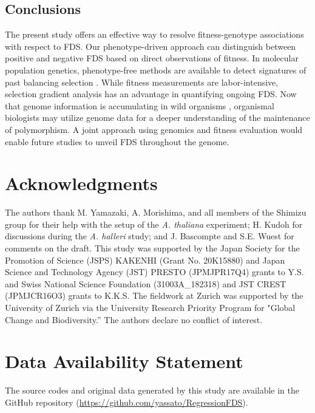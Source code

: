 \documentclass[12pt,]{article}
\begin{document}
\subsection{Conclusions}
The present study offers an effective way to resolve fitness-genotype associations with respect to FDS. Our phenotype-driven approach can distinguish between positive and negative FDS based on direct observations of fitness. In molecular population genetics, phenotype-free methods are available to detect signatures of past balancing selection \citep{siewert_detecting_2017}. While fitness measurements are labor-intensive, selection gradient analysis has an advantage in quantifying ongoing FDS. Now that genome information is accumulating in wild organisms \citep{lewin2018earth}, organismal biologists may utilize genome data for a deeper understanding of the maintenance of polymorphism. A joint approach using genomics and fitness evaluation would enable future studies to unveil FDS throughout the genome.

\section*{Acknowledgments}
The authors thank M. Yamazaki, A. Morishima, and all members of the Shimizu group for their help with the setup of the \textit{A. thaliana} experiment; H. Kudoh for discussions during the \textit{A. halleri} study; and J. Bascompte and S.E. Wuest for comments on the draft. This study was supported by the Japan Society for the Promotion of Science (JSPS) KAKENHI (Grant No. 20K15880) and Japan Science and Technology Agency (JST) PRESTO (JPMJPR17Q4) grants to Y.S. and Swiss National Science Foundation (31003A\_182318) and JST CREST (JPMJCR16O3) grants to K.K.S. The fieldwork at Zurich was supported by the University of Zurich via the University Research Priority Program for "Global Change and Biodiversity.” The authors declare no conflict of interest.

\section*{Data Availability Statement}
The source codes and original data generated by this study are available in the GitHub repository (\url{https://github.com/yassato/RegressionFDS}).

\renewcommand\refname{References}

\newpage
\end{document}
